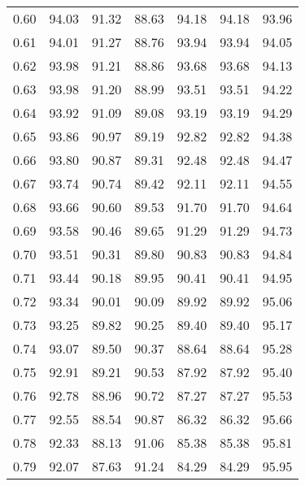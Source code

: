 \begin{tabular}{|c|c|c|c|c|c|c|}
      0.60 &     94.03 &     91.32 &      88.63 &   94.18 &      94.18 &         93.96 \\
      0.61 &     94.01 &     91.27 &      88.76 &   93.94 &      93.94 &         94.05 \\
      0.62 &     93.98 &     91.21 &      88.86 &   93.68 &      93.68 &         94.13 \\
      0.63 &     93.98 &     91.20 &      88.99 &   93.51 &      93.51 &         94.22 \\
      0.64 &     93.92 &     91.09 &      89.08 &   93.19 &      93.19 &         94.29 \\
      0.65 &     93.86 &     90.97 &      89.19 &   92.82 &      92.82 &         94.38 \\
      0.66 &     93.80 &     90.87 &      89.31 &   92.48 &      92.48 &         94.47 \\
      0.67 &     93.74 &     90.74 &      89.42 &   92.11 &      92.11 &         94.55 \\
      0.68 &     93.66 &     90.60 &      89.53 &   91.70 &      91.70 &         94.64 \\
      0.69 &     93.58 &     90.46 &      89.65 &   91.29 &      91.29 &         94.73 \\
      0.70 &     93.51 &     90.31 &      89.80 &   90.83 &      90.83 &         94.84 \\
      0.71 &     93.44 &     90.18 &      89.95 &   90.41 &      90.41 &         94.95 \\
      0.72 &     93.34 &     90.01 &      90.09 &   89.92 &      89.92 &         95.06 \\
      0.73 &     93.25 &     89.82 &      90.25 &   89.40 &      89.40 &         95.17 \\
      0.74 &     93.07 &     89.50 &      90.37 &   88.64 &      88.64 &         95.28 \\
      0.75 &     92.91 &     89.21 &      90.53 &   87.92 &      87.92 &         95.40 \\
      0.76 &     92.78 &     88.96 &      90.72 &   87.27 &      87.27 &         95.53 \\
      0.77 &     92.55 &     88.54 &      90.87 &   86.32 &      86.32 &         95.66 \\
      0.78 &     92.33 &     88.13 &      91.06 &   85.38 &      85.38 &         95.81 \\
      0.79 &     92.07 &     87.63 &      91.24 &   84.29 &      84.29 &         95.95 \\

\end{tabular}
